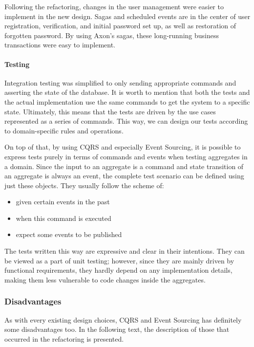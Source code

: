\documentclass{book}
\begin{document}
Following the refactoring, changes in the user management were easier to
implement in the new design. Sagas and scheduled events are in the
center of user registration, verification, and initial password set up,
as well as restoration of forgotten password. By using Axon's sagas,
these long-running business transactions were easy to implement.

\paragraph{Testing}\label{testing}

Integration testing was simplified to only sending appropriate commands
and asserting the state of the database. It is worth to mention that
both the tests and the actual implementation use the same commands to
get the system to a specific state. Ultimately, this means that the
tests are driven by the use cases represented as a series of commands.
This way, we can design our tests according to domain-specific rules and
operations.

On top of that, by using CQRS and especially Event Sourcing, it is
possible to express tests purely in terms of commands and events when
testing aggregates in a domain. Since the input to an aggregate is a
command and state transition of an aggregate is always an event, the
complete test scenario can be defined using just these objects. They
usually follow the scheme of:

\begin{itemize}
\tightlist
\item
  given certain events in the past
\item
  when this command is executed
\item
  expect some events to be published
\end{itemize}

The tests written this way are expressive and clear in their intentions.
They can be viewed as a part of unit testing; however, since they are
mainly driven by functional requirements, they hardly depend on any
implementation details, making them less vulnerable to code changes
inside the aggregates.


\subsubsection{Disadvantages}\label{disadvantages}

As with every existing design choices, CQRS and Event Sourcing has
definitely some disadvantages too. In the following text, the
description of those that occurred in the refactoring is presented.
\end{document}
